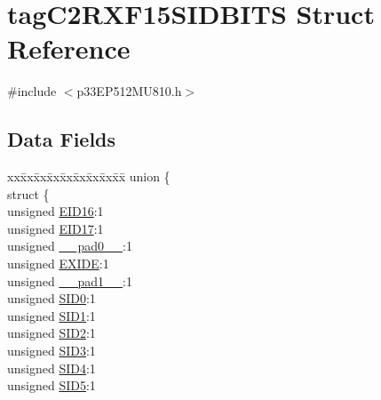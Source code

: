 \hypertarget{structtag_c2_r_x_f15_s_i_d_b_i_t_s}{}\section{tag\+C2\+R\+X\+F15\+S\+I\+D\+B\+I\+TS Struct Reference}
\label{structtag_c2_r_x_f15_s_i_d_b_i_t_s}


{\ttfamily \#include $<$p33\+E\+P512\+M\+U810.\+h$>$}

\subsection*{Data Fields}
\begin{DoxyCompactItemize}
\item 
\begin{tabbing}
xx\=xx\=xx\=xx\=xx\=xx\=xx\=xx\=xx\=\kill
union \{\\
\>struct \{\\
\>\>unsigned \hyperlink{structtag_c2_r_x_f15_s_i_d_b_i_t_s_a6dd5663b0c9838c56db040560ca0efa1}{EID16}:1\\
\>\>unsigned \hyperlink{structtag_c2_r_x_f15_s_i_d_b_i_t_s_aa648615464b0eb29967529333eee9fd9}{EID17}:1\\
\>\>unsigned \hyperlink{structtag_c2_r_x_f15_s_i_d_b_i_t_s_adf71f3d8410c1f1dbbc96680a92c49af}{\_\_pad0\_\_}:1\\
\>\>unsigned \hyperlink{structtag_c2_r_x_f15_s_i_d_b_i_t_s_a09ff1c1be3927220bd3dfbc10edfe243}{EXIDE}:1\\
\>\>unsigned \hyperlink{structtag_c2_r_x_f15_s_i_d_b_i_t_s_acaf2d0924a107ec6e8d2e31febaf66f9}{\_\_pad1\_\_}:1\\
\>\>unsigned \hyperlink{structtag_c2_r_x_f15_s_i_d_b_i_t_s_a1ca276ac15df60e1f7b9a6d0011ade93}{SID0}:1\\
\>\>unsigned \hyperlink{structtag_c2_r_x_f15_s_i_d_b_i_t_s_a3405d354f81391f879648f69f504dfc8}{SID1}:1\\
\>\>unsigned \hyperlink{structtag_c2_r_x_f15_s_i_d_b_i_t_s_ad744966dfc49307f731b7045b01b94e5}{SID2}:1\\
\>\>unsigned \hyperlink{structtag_c2_r_x_f15_s_i_d_b_i_t_s_a9345f3e64720be93e83d8dfc827f3f45}{SID3}:1\\
\>\>unsigned \hyperlink{structtag_c2_r_x_f15_s_i_d_b_i_t_s_aefb106fed4bb40e2c3c71ac612c554e3}{SID4}:1\\
\>\>unsigned \hyperlink{structtag_c2_r_x_f15_s_i_d_b_i_t_s_a0f221b3c9612231686bf87ccdcec8489}{SID5}:1\\

\end{tabbing}
\end{DoxyCompactItemize}
